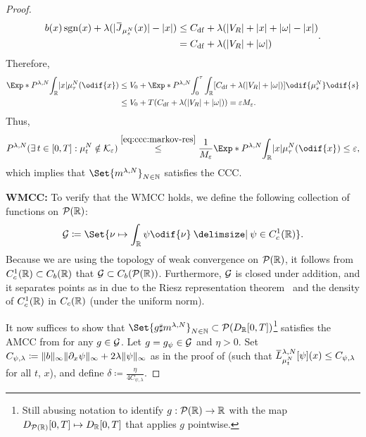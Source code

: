 \begin{proof}
\begin{equation}
\begin{split}
    b(x) \sgn(x) + \lambda (\abs{\ol{J}_{\mu_{s}^N}(x)} - \abs{x})
    &\leq C_\mathrm{df} + \lambda (\abs{V_R} + \abs{x} + \abs{\omega} - \abs{x}) \\
    &= C_\mathrm{df} + \lambda (\abs{V_R} + \abs{\omega})
    \end{split}.
  \end{equation}
  Therefore,
  \begin{equation}
    \begin{split}
    \Exp*{P^{\lambda, N}}{\int_\potspace \abs{x} \mu_\tau^N(\odif{x})}
    &\leq V_0 + \Exp*{P^{\lambda, N}}{\int_0^\tau \int_\potspace \sbr{ C_\mathrm{df} + \lambda (\abs{V_R} + \abs{\omega}) } \odif{\mu_{s}^N} \odif{s} } \\
    &\leq V_0 + T ( C_\mathrm{df} + \lambda (\abs{V_R} + \abs{\omega}) ) = \eps M_\eps.
    \end{split}
  \end{equation}
  Thus,
  \begin{equation}
    P^{\lambda, N} (\exists t \in [0,T] : \mu_t^N \notin \cK_\eps) \overset{\eqref{eq:ccc:markov-res}}{\leq}
    \frac{1}{M_\eps} \Exp*{P^{\lambda, N}}{\int_\potspace \abs{x} \mu_\tau^N(\odif{x})}
    \leq \eps,
  \end{equation}
  which implies that \( \Set{\lawmu^{\lambda,N}}_{N \in \bN} \) satisfies the CCC.

  \bigskip

  \textbf{WMCC:}
  To verify that the WMCC holds, we define the following collection of functions on \(\mathcal{P}(\mathbb{R})\):
  \begin{equation}
    \cG \coloneqq \Set{\nu \mapsto \int_\potspace \psi \odif{\nu} \given \psi \in C_c^1(\potspace)}.
  \end{equation}
  Because we are using the topology of weak convergence on \(\mathcal{P}(\mathbb{R})\), it follows from \(C_c^1(\mathbb{R}) \subset C_b(\mathbb{R})\) that \(\mathcal{G} \subset C_b(\mathcal{P}(\mathbb{R}))\).
  Furthermore, \( \mathcal{G} \) is closed under addition, and it separates points as in  due to the Riesz representation theorem~\cite[Thm. 2.14]{rudinRealComplexAnalysis2013} and the density of \( C_c^1(\mathbb{R}) \) in \( C_c(\mathbb{R}) \) (under the uniform norm).

  It now suffices to show that \( \Set{g \sharp \lawmu^{\lambda, N}}_{N\in\bN} \subset \cP(D_{\potspace}[0,T])\)\footnote{Still abusing notation to identify \( g : \mathcal{P}(\mathbb{R}) \to \mathbb{R} \) with the map \( D_{\mathcal{P}(\mathbb{R})}[0,T] \mapsto D_{\mathbb{R}}[0,T] \) that applies \( g \) pointwise.} satisfies the AMCC from  for any \( g \in \mathcal{G} \).
  Let \( g = g_\psi \in \mathcal{G} \) and \( \eta > 0 \).
  Set \( C_{\psi, \lambda} \coloneqq \lVert b\rVert_\infty \lVert\partial_x \psi\rVert_\infty + 2\lambda \lVert\psi\rVert_\infty \) as in the proof of  (such that \( \ol{L}_{\mu_t^N}^{\lambda,N} [\psi] (x) \leq C_{\psi, \lambda} \) for all \( t \), \( x \)), and define \(\delta \coloneqq \frac{\eta}{4C_{\psi, \lambda}}\).


\end{proof}
